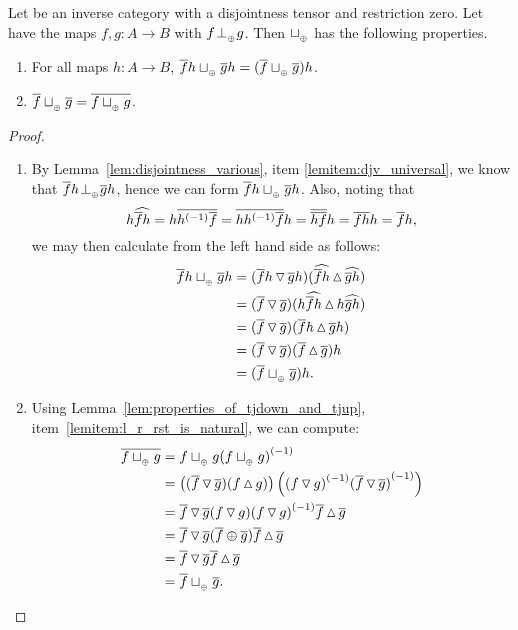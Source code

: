 \begin{lemma}\label{lem:tensor_disjoint_join_properties}
  Let \X be an inverse category with a disjointness tensor and restriction zero. Let \X have the
  maps $f,g: A \to B$ with $f{}_{{}_{}}{\perp_{{}_{\oplus}}} g$. Then $\sqcup_{{_{\oplus}}}$ has the following properties.
  \begin{enumerate}[{(}i{)}]
    \item For all maps $h:A \to B$, $\overline{f}h \sqcup_{{_{\oplus}}} \overline{g}h = (\overline{f}\sqcup_{{_{\oplus}}} \overline{g})h$.
      \label{lemitem:tdj_rst_universal}
    \item $\overline{f}\sqcup_{{_{\oplus}}} \overline{g} = \overline{f\sqcup_{{_{\oplus}}} g}$. \label{lemitem:tdj_rst_is_rst}
  \end{enumerate}
\end{lemma}
\begin{proof}
  \begin{enumerate}[{(}i{)}]
    \item By Lemma~\ref{lem:disjointness_various}, item \ref{lemitem:djv_universal}, we know that
    $\overline{f}h {}_{{}_{}}{\perp_{{}_{\oplus}}} \overline{g} h$, hence we can form $\overline{f}h \sqcup_{{_{\oplus}}} \overline{g}h$.
    Also, noting that
      \[
        h \widehat{\overline{f} h} = h \overline{{h}^{(-1)}\overline{f}} = \overline{h {h}^{(-1)} \overline{f}} h
          = \overline{\overline{h}\overline{f}} h = \overline{f} \overline{h}h = \overline{f} h,
      \]
      we may then calculate from the left hand side as follows:
      \begin{align*}
        \overline{f}h \sqcup_{{_{\oplus}}} \overline{g}h
          & = (\overline{f}h \operatorname{\triangledown} \overline{g} h) (\widehat{\overline{f}h}\operatorname{\vartriangle}\widehat{\overline{g} h})\\
          & = (\overline{f} \operatorname{\triangledown} \overline{g} ) (h\widehat{\overline{f}h}\operatorname{\vartriangle} h\widehat{\overline{g} h})\\
          & = (\overline{f} \operatorname{\triangledown} \overline{g} ) (\overline{f}h\operatorname{\vartriangle} \overline{g} h)\\
          & = (\overline{f} \operatorname{\triangledown} \overline{g} ) (\overline{f}\operatorname{\vartriangle} \overline{g} )h\\
          & = (\overline{f} \sqcup_{{_{\oplus}}} \overline{g} ) h.
      \end{align*}
    \item
    Using Lemma~\ref{lem:properties_of_tjdown_and_tjup}, item~\ref{lemitem:l_r_rst_is_natural},
    we can compute:
    \begin{align*}
      \overline{f\sqcup_{{_{\oplus}}} g} & = f \sqcup_{{_{\oplus}}} g {(f\sqcup_{{_{\oplus}}} g)}^{(-1)} \\
      & = \left((\overline{f} \operatorname{\triangledown} \overline{g})(f\operatorname{\vartriangle} g)\right)
             \left({(f\operatorname{\triangledown} g)}^{(-1)} {(\overline{f}\operatorname{\triangledown} \overline{g})}^{(-1)}\right)\\
      & = \overline{f}\operatorname{\triangledown}\overline{g}(f\operatorname{\triangledown} g) {(f\operatorname{\triangledown} g)}^{(-1)} \overline{f}\operatorname{\vartriangle} \overline{g}\\
      & = \overline{f}\operatorname{\triangledown}\overline{g}(\overline{f}\oplus \overline{g})\overline{f}\operatorname{\vartriangle} \overline{g}\\
      & = \overline{f}\operatorname{\triangledown}\overline{g}\overline{f}\operatorname{\vartriangle} \overline{g}\\
      & = \overline{f}\sqcup_{{_{\oplus}}}\overline{g}.
    \end{align*}
  \end{enumerate}
\end{proof}


